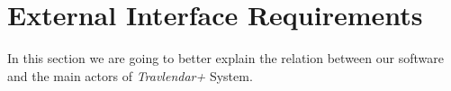 \section{External Interface Requirements}
In this section we are going to better explain the relation between our software and the main actors of \emph{Travlendar+} System.


